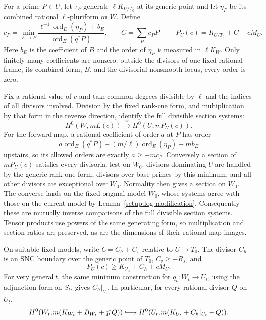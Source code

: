 For a prime $P\subset U$, let $\tau_P$ generate $\ell K_{U/T_0}$
at its generic point and let $\eta_P$ be its combined rational
$\ell$-pluriform on $W$.  Define
\begin{equation}\label{num:order-divisor}
 c_P=\min_{E\mapsto P}
 \frac{\ell^{-1}\operatorname{ord}_E(\eta_P)+b_E}
 {\operatorname{ord}_E(q^*P)},\qquad
 C=\sum_Pc_PP,\qquad P_U(c)=K_{U/T_0}+C+cM_U.
\end{equation}
Here $b_E$ is the coefficient of $B$ and the order of $\eta_P$ is
measured in $\ell K_W$.  Only finitely many coefficients are nonzero:
outside the divisors of one fixed rational frame, its combined form,
$B$, and the divisorial nonsmooth locus, every order is zero.

Fix a rational value of $c$ and take common degrees divisible by
$\ell$ and the indices of all divisors involved. Division by the
fixed rank-one form, and multiplication by that form in the reverse
direction, identify the full divisible section systems:
\begin{equation}\label{num:descent}
 H^0(W,mL(c))\xrightarrow{\ \sim\ }H^0(U,mP_U(c)).
\end{equation}
For the forward map, a rational coefficient of order $a$ at $P$ has order
\[
 a\operatorname{ord}_E(q^*P)+(m/\ell)\operatorname{ord}_E(\eta_P)+mb_E
\]
upstairs, so its allowed orders are exactly $a\geq-mc_P$.
Conversely a section of $mP_U(c)$ satisfies every divisorial test on
$W_0$: divisors dominating $U$ are handled by the generic rank-one
form, divisors over base primes by this minimum, and all other
divisors are exceptional over $W_0$.  Normality then gives a section
on $W_0$.  The converse lands on the fixed original model $W_0$, whose systems
agree with those on the current model by
Lemma~\ref{setup:log-modification}. Consequently these are mutually
inverse comparisons of the full divisible section systems. Tensor
products use powers of the same generating form, so multiplication
and section ratios are preserved, as are the dimensions of their
rational-map images.

\begin{lemma}\label{num:orders}
On suitable fixed models, write $C=C_h+C_v$ relative to $U\to T_0$.
The divisor $C_h$ is an SNC boundary over the generic point of $T_0$,
$C_v\geq-R_s$, and
\begin{equation}\label{num:order-lower}
 P_U(c)\geq K_{\mathcal V_s}+C_h+cM_U.
\end{equation}
For very general $t$, the same minimum construction for
$q_t:W_t\to U_t$, using the adjunction form on $S_t$, gives
$C_h|_{U_t}$.  In particular, for every rational divisor $Q$ on $U_t$,
\begin{equation}\label{num:fiber-descent}
 H^0(W_t,m(K_{W_t}+B_{W_t}+q_t^*Q))
 \lhook\joinrel\longrightarrow
 H^0(U_t,m(K_{U_t}+C_h|_{U_t}+Q)).
\end{equation}
\end{lemma}

